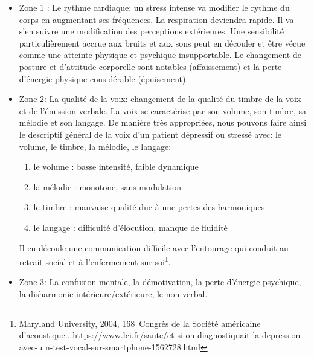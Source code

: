 \begin{enumerate}
\begin{itemize}
  	\item Zone 1 :  Le rythme cardiaque: un stress intense va modifier le rythme
  du corps en augmentant ses fréquences. La respiration deviendra
  rapide. Il va s'en suivre une modification des perceptions
  extérieures. Une sensibilité particulièrement accrue aux bruits et
  aux sons peut en découler et être vécue comme une
  atteinte physique et psychique insupportable.
  Le changement de posture et d'attitude corporelle sont
notables (affaissement) et la perte d'énergie physique considérable (épuisement).
	\item Zone 2: La qualité de la voix: changement de la qualité du timbre de la
 voix et de l'émission verbale.	
  La voix se caractérise par son volume, son timbre, sa mélodie et son langage. 
	De manière très appropriées, nous pouvons faire ainsi le
        descriptif général de la voix d'un patient dépressif ou
        stressé avec: le volume, le timbre, la
        mélodie, le langage: 
 	\begin{enumerate}
 		\item le volume : basse intensité, faible dynamique
 		\item la mélodie : monotone, sans modulation
 		\item le timbre : mauvaise qualité due à une pertes des harmoniques
 		\item le langage : difficulté d'élocution, manque de fluidité
 	\end{enumerate}
        Il en découle une communication difficile avec l'entourage qui  conduit au retrait social et à l'enfermement sur soi\footnote{Maryland University, 2004, 168\ieme\ Congrès de la Société
américaine d'acoustique.\autocite{le_service_metronews}. https://www.lci.fr/sante/et-si-on-diagnostiquait-la-depression-avec-u
n-test-vocal-sur-smartphone-1562728.html}.
        
	\item Zone 3: La confusion mentale, la démotivation, la perte d'énergie
psychique, la disharmonie intérieure/extérieure, le non-verbal.
\end{itemize}


\end{enumerate}

